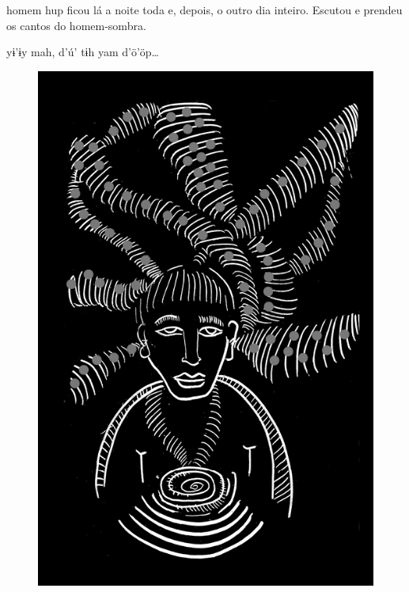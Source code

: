 \chapter*{}

\mbox{}\vspace*{\fill}

 homem hup ficou
lá a noite toda e,
depois, o outro dia
inteiro. Escutou e
prendeu os cantos
do homem-sombra.

\vspace{2em}

 yɨ’ɨy mah,
d’ú’ tɨh yam d’ö’öp\ldots{}

\vspace*{\fill}

\begin{figure}
\vspace*{-1.5cm}
\hspace*{-2.4cm}\includegraphics[width=142mm]{./imgs/img4.jpg}
\end{figure}

